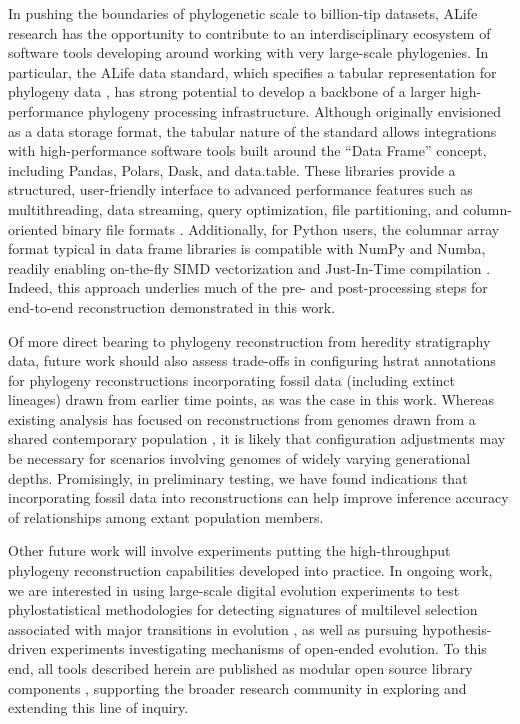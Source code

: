 In pushing the boundaries of phylogenetic scale to billion-tip datasets, ALife research has the opportunity to contribute to an interdisciplinary ecosystem of software tools developing around working with very large-scale phylogenies.
In particular, the ALife data standard, which specifies a tabular representation for phylogeny data \citep{Lalejini2019data}, has strong potential to develop a backbone of a larger high-performance phylogeny processing infrastructure.
Although originally envisioned as a data storage format, the tabular nature of the standard allows integrations with high-performance software tools built around the ``Data Frame'' concept, including Pandas, Polars, Dask, and data.table.
These libraries provide a structured, user-friendly interface to advanced performance features such as multithreading, data streaming, query optimization, file partitioning, and column-oriented binary file formats \citep{mckinney2010data,datatable,vink2024polars,rocklin2015dask}.
Additionally, for Python users, the columnar array format typical in data frame libraries is compatible with NumPy and Numba, readily enabling on-the-fly SIMD vectorization and Just-In-Time compilation \citep{harris2020array,lam2015numba}.
Indeed, this approach underlies much of the pre- and post-processing steps for end-to-end reconstruction demonstrated in this work.

Of more direct bearing to phylogeny reconstruction from heredity stratigraphy data, future work should also assess trade-offs in configuring hstrat annotations for phylogeny reconstructions incorporating fossil data (including extinct lineages) drawn from earlier time points, as was the case in this work.
Whereas existing analysis has focused on reconstructions from genomes drawn from a shared contemporary population \citep{moreno2025testing}, it is likely that configuration adjustments may be necessary for scenarios involving genomes of widely varying generational depths.
Promisingly, in preliminary testing, we have found indications that incorporating fossil data into reconstructions can help improve inference accuracy of relationships among extant population members.

Other future work will involve experiments putting the high-throughput phylogeny reconstruction capabilities developed into practice.
In ongoing work, we are interested in using large-scale digital evolution experiments to test phylostatistical methodologies for detecting signatures of multilevel selection associated with major transitions in evolution \citep{BonettiFranceschi2024}, as well as pursuing hypothesis-driven experiments investigating mechanisms of open-ended evolution.
To this end, all tools described herein are published as modular open source library components \citep{moreno2024hstrat}, supporting the broader research community in exploring and extending this line of inquiry.
